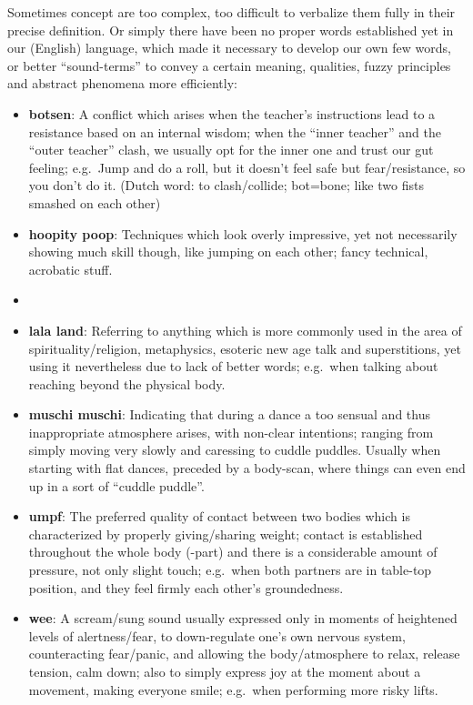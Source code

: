 Sometimes concept are too complex, too difficult to verbalize them fully in their precise definition.
Or simply there have been no proper words established yet in our (English) language, which made it necessary to develop our own few words, or better ``sound-terms'' to convey a certain meaning, qualities, fuzzy principles and abstract phenomena more efficiently:

\begin{itemize}
    \item \textbf{botsen}: A conflict which arises when the teacher's instructions lead to a resistance based on an internal wisdom; when the ``inner teacher'' and the ``outer teacher'' clash, we usually opt for the inner one and trust our gut feeling; e.g.\ Jump and do a roll, but it doesn't feel safe but fear/resistance, so you don't do it.
    (Dutch word: to clash/collide; bot=bone; like two fists smashed on each other)
    \item \textbf{hoopity poop}: Techniques which look overly impressive, yet not necessarily showing much skill though, like jumping on each other; fancy technical, acrobatic stuff.
    \item \item \textbf{lala land}: Referring to anything which is more commonly used in the area of spirituality/religion, metaphysics, esoteric new age talk and superstitions, yet using it nevertheless due to lack of better words; e.g.\ when talking about reaching beyond the physical body.
    \item \textbf{muschi muschi}: Indicating that during a dance a too sensual and thus inappropriate atmosphere arises, with non-clear intentions; ranging from simply moving very slowly and caressing to cuddle puddles.
    Usually when starting with flat dances, preceded by a body-scan, where things can even end up in a sort of ``cuddle puddle''.
    \item \textbf{umpf}: The preferred quality of contact between two bodies which is characterized by properly giving/sharing weight; contact is established throughout the whole body (-part) and there is a considerable amount of pressure, not only slight touch; e.g.\ when both partners are in table-top position, and they feel firmly each other's groundedness.
    \item \textbf{wee}: A scream/sung sound usually expressed only in moments of heightened levels of alertness/fear, to down-regulate one's own nervous system, counteracting fear/panic, and allowing the body/atmosphere to relax, release tension, calm down; also to simply express joy at the moment about a movement, making everyone smile; e.g.\ when performing more risky lifts.
\end{itemize}

